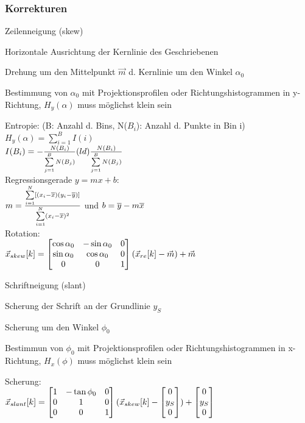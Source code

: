 \documentclass[german,color,6pt]{latex4ei/latex4ei_sheet}
\begin{document}
\begin{sectionbox}
	\subsubsection{Korrekturen}
		\begin{cookbox}{Zeilenneigung (skew)}
			\item Horizontale Ausrichtung der Kernlinie des Geschriebenen
			\item Drehung um den Mittelpunkt $\vec m$ d. Kernlinie um den Winkel $\alpha_0$
			\item Bestimmung von $\alpha_0$ mit Projektionsprofilen oder Richtungshistogrammen in y-Richtung, $H_y(\alpha)$ muss möglichst klein sein
		\end{cookbox}

		Entropie: (B: Anzahl d. Bins, N($B_i$): Anzahl d. Punkte in Bin i)\\
		$H_y(\alpha) = \sum\limits_{i=1}^{B}I(i)$\\
		$I(B_i) = - \frac{N(B_i)}{\sum\limits_{j=1}^{B} N(B_j)} \text(ld) \frac{N(B_i)}{\sum\limits_{j=1}^{B} N(B_j)}$\\
		Regressionsgerade $y = mx+b$:\\
		$m=\frac{\sum \limits_{i=1}^{N}[(x_i - \overline{x}) (y_i - \overline{y})]}{\sum \limits_{i=1}^{N} (x_i - \overline{x})^2}$ und $b= \overline{y} - m \overline{x}$\\
		Rotation:\\
		$\vec x_{skew}[k] = \mat{ \cos \alpha_0 & -\sin \alpha_0 & 0 \\ \sin \alpha_0 & \cos \alpha_0 & 0 \\ 0&0&1} (\vec x_{re}[k] - \vec m)+ \vec m$\\


		\begin{cookbox}{Schriftneigung (slant)}
			\item Scherung der Schrift an der Grundlinie $y_S$
			\item Scherung um den Winkel $\phi_0$
			\item Bestimmun von  $\phi_0$ mit  Projektionsprofilen oder Richtungshistogrammen in x-Richtung, $H_x(\phi)$ muss möglichst klein sein
		\end{cookbox}

		Scherung:\\
		$\vec x_{slant}[k] = \mat{ 1 & -\tan\phi_0 & 0 \\ 0& 1 & 0\\ 0 & 0 & 1} (\vec x_{skew}[k]- \mat{0 \\ y_S \\ 0})+ \mat{0 \\ y_S \\ 0}$ \\
\end{sectionbox}
\end{document}
